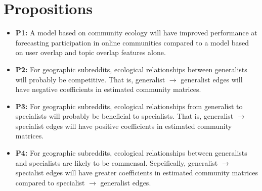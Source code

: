 \documentclass[12pt]{memoir}
\begin{document}
\section{Propositions}

\begin{itemize}

\item \textbf{P1:} A model based on community ecology will have improved performance at forecasting participation in online communities compared to a model based on user overlap and topic overlap features alone. 

\item \textbf{P2:} For geographic subreddits, ecological relationships between generalists will probably be competitive. That is, generalist $\rightarrow$ generalist edges will have negative coefficients in estimated community matrices. 

\item \textbf{P3:} For geographic subreddits, ecological relationships from generalist to specialists will probably be beneficial to specialists. That is, generalist $\rightarrow$ specialist edges will have positive coefficients in estimated community matrices.

\item \textbf{P4:} For geographic subreddits, ecological relationships between generalists and specialists are likely to be commensal. Sepcifically, generalist $\rightarrow$ specialist edges will have greater coefficients in estimated community matrices compared to specialist $\rightarrow$ generalist edges. 

\end{itemize}
\end{document}

